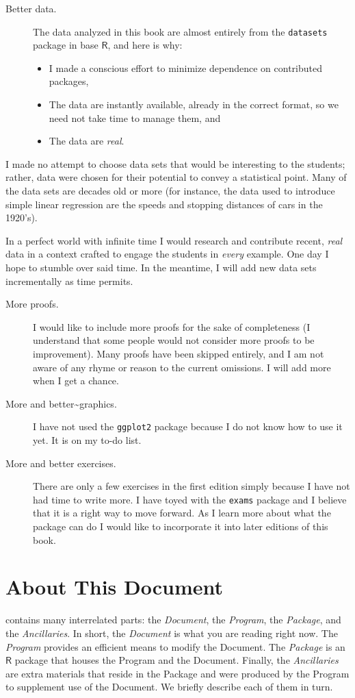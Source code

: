 \begin{description}
\item[Better data.] The data analyzed in this book are almost entirely from the \texttt{datasets} package in base \(\mathsf{R}\), and here is why:
\begin{itemize}
\item I made a conscious effort to minimize dependence on contributed packages,
\item The data are instantly available, already in the correct format, so we need not take time to manage them, and
\item The data are \emph{real}.
\end{itemize}
\end{description}

I made no attempt to choose data sets that would be interesting to the students; rather, data were chosen for their potential to convey a statistical point. Many of the data sets are decades old or more (for instance, the data used to introduce simple linear regression are the speeds and stopping distances of cars in the 1920's).

In a perfect world with infinite time I would research and contribute recent, \emph{real} data in a context crafted to engage the students in \emph{every} example. One day I hope to stumble over said time. In the meantime, I will add new data sets incrementally as time permits.
\begin{description}
\item[More proofs.] I would like to include more proofs for the sake of completeness (I understand that some people would not consider more proofs to be improvement). Many proofs have been skipped entirely, and I am not aware of any rhyme or reason to the current omissions. I will add more when I get a chance.
\item[More and better\~{}graphics.] I have not used the \texttt{ggplot2} package \cite{Wickam2009} because I do not know how to use it yet. It is on my to-do list.
\item[More and better exercises.] There are only a few exercises in the first edition simply because I have not had time to write more. I have toyed with the \texttt{exams} package \cite{exams} and I believe that it is a right way to move forward. As I learn more about what the package can do I would like to incorporate it into later editions of this book.
\end{description}


\section*{About This Document}
\IPSUR contains many interrelated parts: the \emph{Document}, the \emph{Program}, the \emph{Package}, and the \emph{Ancillaries}. In short, the \emph{Document} is what you are reading right now. The \emph{Program} provides an efficient means to modify the Document. The \emph{Package} is an \(\mathsf{R}\) package that houses the Program and the Document. Finally, the \emph{Ancillaries} are extra materials that reside in the Package and were produced by the Program to supplement use of the Document. We briefly describe each of them in turn.

